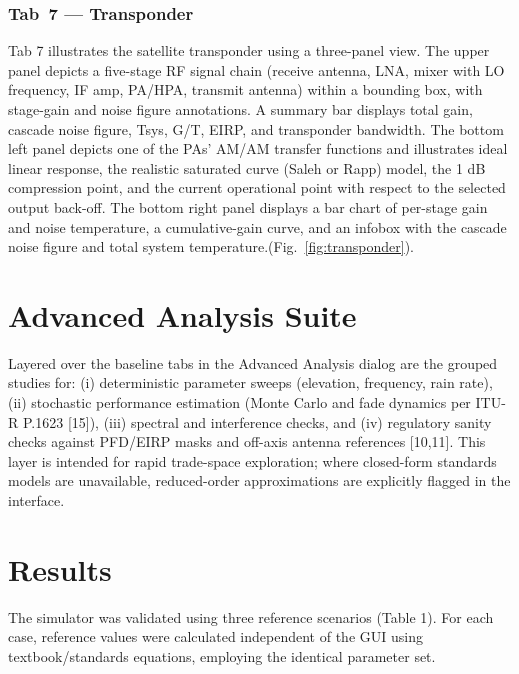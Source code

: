 \documentclass[telecom,article,submit,pdftex,moreauthors]{Definitions/mdpi}
\begin{document}
\subsubsection{\textbf{Tab~7 — Transponder}}
Tab 7 illustrates the satellite transponder using a three-panel view. The upper panel depicts a five-stage RF signal chain (receive antenna, LNA, mixer with LO frequency, IF amp, PA/HPA, transmit antenna) within a bounding box, with stage-gain and noise figure annotations.  A summary bar displays total gain, cascade noise figure, Tsys, G/T, EIRP, and transponder bandwidth. The bottom left panel depicts one of the PAs’ AM/AM transfer functions and illustrates ideal linear response, the realistic saturated curve (Saleh or Rapp) model, the 1 dB compression point, and the current operational point with respect to the selected output back-off. The bottom right panel displays a bar chart of per-stage gain and noise temperature, a cumulative-gain curve, and an infobox with the cascade noise figure and total system temperature.(Fig.~\ref{fig:transponder}).

\section{Advanced Analysis Suite}
\label{sec:advanced}

Layered over the baseline tabs in the Advanced Analysis dialog are the grouped studies for: (i) deterministic parameter sweeps (elevation, frequency, rain rate), (ii) stochastic performance estimation (Monte Carlo and fade dynamics per ITU-R P.1623 [15]), (iii) spectral and interference checks, and (iv) regulatory sanity checks against PFD/EIRP masks and off-axis antenna references [10,11]. This layer is intended for rapid trade-space exploration; where closed-form standards models are unavailable, reduced-order approximations are explicitly flagged in the interface.


\section{Results}
\label{sec:validation}

The simulator was validated using three reference scenarios (Table 1). For each case, reference values were calculated independent of the GUI using textbook/standards equations, employing the identical parameter set.
\end{document}
